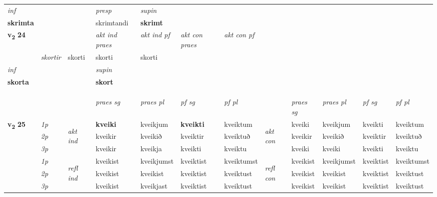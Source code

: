 \begin{longtable}[l]{X>{\footnotesize\itshape}llXXXXlXXXX}
   {\textit{inf}} & &     & \textit{presp} & \textit{supin}   \\*
  {\textbf{skrimta}} & &     & skrimtandi &  \textbf{skrimt}   \\*

\midrule

\multirow{2}{*}{{{\textbf{v{\textsubscript{2}}} \Large{\textbf{24}}}}}  &&&  \textit{akt ind praes} & \textit{akt ind pf} & \textit{akt con praes} & \textit{akt con pf} \\*
\multicolumn{3}{r}{\textit{e-n / það}} & skortir & skorti & skorti & skorti \\*

\cmidrule{4-7}
   {\textit{inf}} & &      & \textit{supin}   \\*
  {\textbf{skorta}} & &      &  \textbf{skort}   \\*

\midrule

 & \\*
     & \\*
  & \\
   \midrule
 & &   & \textit{praes sg}  & \textit{praes pl}    & \textit{ pf sg} & \textit{pf pl} & & \textit{praes sg}  & \textit{praes pl}    & \textit{pf sg} & \textit{pf pl }  \\ \cmidrule{4-7} \cmidrule{9-12}
 \multirow{2}{*}{{{\textbf{v{\textsubscript{2}}} \Large{\textbf{25}}}}}  & 1p & \multirow{3}{*}{\begin{turn}{90}\textit{akt ind}\end{turn}} & \textbf{kveiki} & kveikjum & \textbf{kveikti} & kveiktum & \multirow{3}{*}{\begin{turn}{90}\textit{akt con}\end{turn}} &kveiki & kveikjum & kveikti & kveiktum\\*
 & 2p &  &  kveikir  & kveikið & kveiktir & kveiktuð & & kveikir & kveikið & kveiktir & kveiktuð \\*
 & 3p &  & kveikir & kveikja & kveikti & kveiktu & & kveiki & kveiki& kveikti & kveiktu \\*
\cmidrule{4-7} \cmidrule{9-12}
 & 1p & \multirow{3}{*}{\begin{turn}{90}\textit{refl ind}\end{turn}}  & kveikist & kveikjumst & kveiktist & kveiktumst & \multirow{3}{*}{\begin{turn}{90}\textit{refl con}\end{turn}}  &kveikist & kveikjumst & kveiktist & kveiktumst \\*
 & 2p &  & kveikist & kveikist & kveiktist & kveiktust & &kveikist & kveikist & kveiktist & kveiktust \\*
 & 3p  & & kveikist & kveikjast & kveiktist & kveiktust & & kveikist & kveikist& kveiktist & kveiktust \\*
\cmidrule{4-7} \cmidrule{9-12}


\end{longtable}
